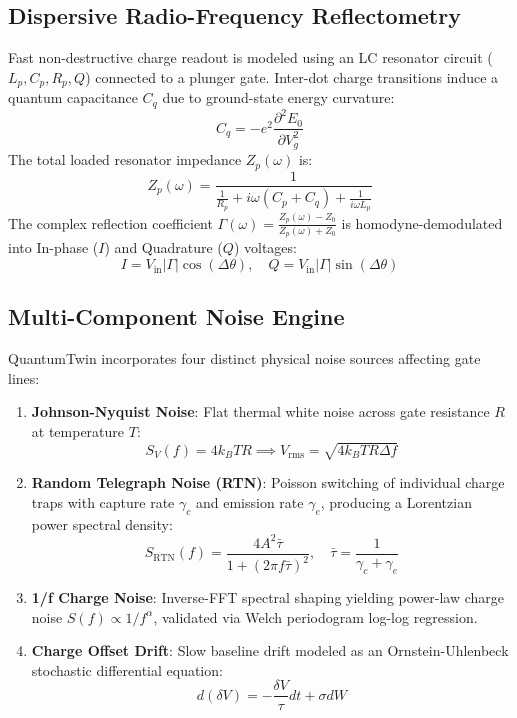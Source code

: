 \documentclass[journal,twocolumn,10pt]{IEEEtran}
\begin{document}
\subsection{Dispersive Radio-Frequency Reflectometry}
Fast non-destructive charge readout is modeled using an LC resonator circuit ($L_p, C_p, R_p, Q$) connected to a plunger gate. Inter-dot charge transitions induce a quantum capacitance $C_q$ due to ground-state energy curvature:
\begin{equation}
C_q = -e^2 \frac{\partial^2 E_0}{\partial V_g^2}
\end{equation}
The total loaded resonator impedance $Z_p(\omega)$ is:
\begin{equation}
Z_p(\omega) = \frac{1}{\frac{1}{R_p} + i \omega (C_p + C_q) + \frac{1}{i \omega L_p}}
\end{equation}
The complex reflection coefficient $\Gamma(\omega) = \frac{Z_p(\omega) - Z_0}{Z_p(\omega) + Z_0}$ is homodyne-demodulated into In-phase ($I$) and Quadrature ($Q$) voltages:
\begin{equation}
I = V_{\text{in}} |\Gamma| \cos(\Delta\theta), \quad Q = V_{\text{in}} |\Gamma| \sin(\Delta\theta)
\end{equation}

\subsection{Multi-Component Noise Engine}
QuantumTwin incorporates four distinct physical noise sources affecting gate lines:
\begin{enumerate}
    \item \textbf{Johnson-Nyquist Noise}: Flat thermal white noise across gate resistance $R$ at temperature $T$:
    \begin{equation}
    S_V(f) = 4 k_B T R \implies V_{\text{rms}} = \sqrt{4 k_B T R \Delta f}
    \end{equation}
    \item \textbf{Random Telegraph Noise (RTN)}: Poisson switching of individual charge traps with capture rate $\gamma_c$ and emission rate $\gamma_e$, producing a Lorentzian power spectral density:
    \begin{equation}
    S_{\text{RTN}}(f) = \frac{4 A^2 \bar{\tau}}{1 + (2\pi f \bar{\tau})^2}, \quad \bar{\tau} = \frac{1}{\gamma_c + \gamma_e}
    \end{equation}
    \item \textbf{1/f Charge Noise}: Inverse-FFT spectral shaping yielding power-law charge noise $S(f) \propto 1/f^\alpha$, validated via Welch periodogram log-log regression.
    \item \textbf{Charge Offset Drift}: Slow baseline drift modeled as an Ornstein-Uhlenbeck stochastic differential equation:
    \begin{equation}
    d(\delta V) = -\frac{\delta V}{\tau} dt + \sigma dW
    \end{equation}
\end{enumerate}
\end{document}
